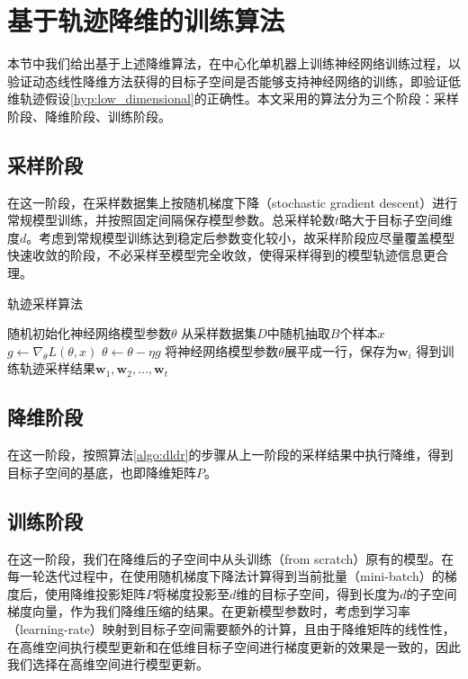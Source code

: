 \section{基于轨迹降维的训练算法}

本节中我们给出基于上述降维算法，在中心化单机器上训练神经网络训练过程，以验证动态线性降维方法获得的目标子空间是否能够支持神经网络的训练，即验证低维轨迹假设\ref{hyp:low_dimensional}的正确性。本文采用的算法分为三个阶段：采样阶段、降维阶段、训练阶段。

\subsection{采样阶段}

在这一阶段，在采样数据集上按随机梯度下降（stochastic gradient descent）进行常规模型训练，并按照固定间隔保存模型参数。总采样轮数$t$略大于目标子空间维度$d$。考虑到常规模型训练达到稳定后参数变化较小，故采样阶段应尽量覆盖模型快速收敛的阶段，不必采样至模型完全收敛，使得采样得到的模型轨迹信息更合理。


\begin{algorithm}[htb]
    \caption{轨迹采样算法}
    \label{algo:sgd_with_sampling}
    \small
    \SetAlgoLined
    随机初始化神经网络模型参数$\theta$\;
     {
         {
            从采样数据集$D$中随机抽取$B$个样本$x$\;
            $g \leftarrow \nabla_{\theta} L(\theta, x)$\;
            $\theta \leftarrow \theta - \eta g$\;
        }
        将神经网络模型参数$\theta$展平成一行，保存为$\mathbf{w}_i$\;
    }
    得到训练轨迹采样结果$\mathbf{w}_1, \mathbf{w}_2, \dots, \mathbf{w}_t$\;

  \end{algorithm}

\subsection{降维阶段}

在这一阶段，按照算法\ref{algo:dldr}的步骤从上一阶段的采样结果中执行降维，得到目标子空间的基底，也即降维矩阵$P$。


\subsection{训练阶段}

在这一阶段，我们在降维后的子空间中从头训练（from scratch）原有的模型。在每一轮迭代过程中，在使用随机梯度下降法计算得到当前批量（mini-batch）的梯度后，使用降维投影矩阵$P$将梯度投影至$d$维的目标子空间，得到长度为$d$的子空间梯度向量，作为我们降维压缩的结果。在更新模型参数时，考虑到学习率（learning-rate）映射到目标子空间需要额外的计算，且由于降维矩阵的线性性，在高维空间执行模型更新和在低维目标子空间进行梯度更新的效果是一致的，因此我们选择在高维空间进行模型更新。


